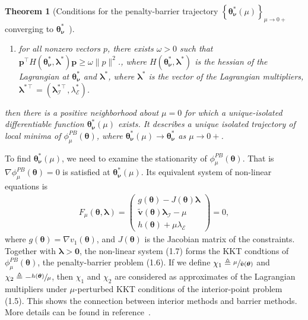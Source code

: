 \documentclass{article}
\newcommand{\itl}{\intercal}
\newcommand{\bs}{ \boldsymbol}
\newcommand{\ml}{\mathcal}
\newcommand{\lt}{\left}
\newcommand{\rt}{\right}
\newtheorem{theorem}{Theorem}[section]
\begin{document}
\begin{theorem}[Conditions for the penalty-barrier trajectory $\lt\{ \bs{\theta}_{\bs{\nu}}^*(\mu)\rt\}_{\mu \to 0+}$ converging to $\bs{\theta}_{\bs{\nu}}^*$~\cite{NoceWrig06,fiacco,Forsgren2002}]
\begin{enumerate}
\begin{enumerate}
			\item for all nonzero vectors $p$, there exists $\omega > 0$ such that $\bs{p}^{\itl}H(\bs{\theta}_{\bs{\nu}}^*, \bs{\lambda}^*) \bs{p} \ge \omega \|p\|^2$., where $H(\bs{\theta}_{\bs{\nu}}^*, \bs{\lambda}^*) $ is the hessian of the Lagrangian at $\bs{\theta}_{\bs{\nu}}^*$ and $\bs{\lambda}^*$, where $\bs{\lambda}^*$ is the vector of the Lagrangian multipliers, $\bs{\lambda}^{*\itl} =  \lt(\bs{\lambda}_{\ml{I}}^{*\itl}, \lambda_{\ml{E}}^*\rt)$.
		\end{enumerate} 
		then there is a positive neighborhood about $\mu = 0$ for which a unique-isolated differentiable function $\bs{\theta}^*_{\bs{\nu}}(\mu)$ exists. It describes a unique isolated trajectory of local minima of $\phi_{\mu}^{PB}(\bs{\theta})$, where $\bs{\theta}^*_{\bs{\nu}}(\mu) \to \bs{\theta}^*_{\bs{\nu}}$ as $\mu \to 0+$.
	\end{enumerate}
\end{theorem}
To find $\bs{\theta}^*_{\bs{\nu}}(\mu)$, we need to examine the stationarity of $\phi_{\mu}^{PB}(\bs{\theta})$. That is $\nabla\phi_{\mu}^{PB}(\bs{\theta}) = 0$ is satisfied at $\bs{\theta}^*_{\bs{\nu}}(\mu)$. Its equivalent system of non-linear equations is
\begin{align}
F_{\mu}(\bs{\theta}, \bs{\lambda}) = 
\begin{pmatrix} g(\bs{\theta}) - J(\bs{\theta}) \bs{\lambda} \\ \tilde{\bs{v}}( \bs{\theta}) \bs{\lambda}_{\ml{I}} - \mu \\ h(\bs{\theta}) + \mu \lambda_{\ml{E}} \end{pmatrix} = 0,
\end{align}
where $g(\bs{\theta}) = \nabla v_1(\bs{\theta})$, and $J(\bs{\theta})$ is the Jacobian matrix of the constraints.\\

Together with $\bs{\lambda} > \bs{0}$, the non-linear system (1.7) forms the KKT condtions of $\phi^{PB}_{\mu}(\bs{\theta})$, the penalty-barrier problem (1.6). If we define $\chi_1 \triangleq \sfrac{\mu}{\tilde{\bs{v}}(\bs{\theta})}$ and $\chi_2 \triangleq - \sfrac{h(\bs{\theta})}{\mu}$, then $\chi_1$ and $\chi_2$ are considered as approximates of the Lagrangian multipliers under  $\mu$-perturbed KKT conditions of the interior-point problem (1.5). This shows the connection between interior methods and barrier methods. More details can be found in reference~\cite{NoceWrig06,fiacco,Forsgren2002}. \\
\end{document}

